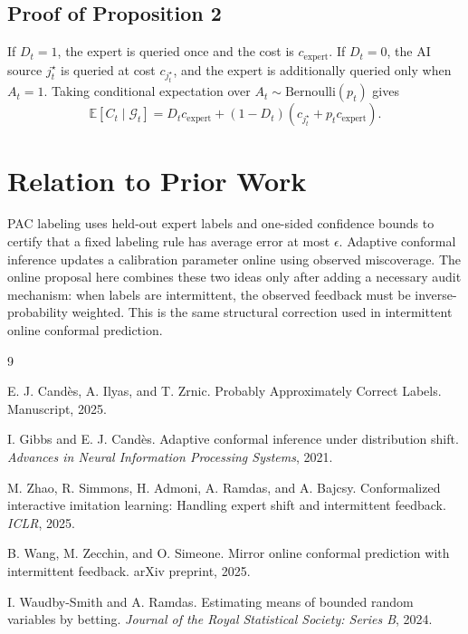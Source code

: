 \documentclass[11pt]{article}
\newcommand{\E}{\mathbb{E}}
\newcommand{\1}{\mathbf{1}}
\newcommand{\calG}{\mathcal{G}}
\begin{document}
\subsection{Proof of Proposition 2}

If $D_t=1$, the expert is queried once and the cost is $c_{\mathrm{expert}}$. If $D_t=0$, the AI source $j_t^\star$ is queried at cost $c_{j_t^\star}$, and the expert is additionally queried only when $A_t=1$. Taking conditional expectation over $A_t\sim\mathrm{Bernoulli}(p_t)$ gives
\[
\E[C_t\mid\calG_t]
=D_t c_{\mathrm{expert}}+(1-D_t)(c_{j_t^\star}+p_t c_{\mathrm{expert}}).
\]

\section{Relation to Prior Work}

PAC labeling uses held-out expert labels and one-sided confidence bounds to certify that a fixed labeling rule has average error at most $\epsilon$. Adaptive conformal inference updates a calibration parameter online using observed miscoverage. The online proposal here combines these two ideas only after adding a necessary audit mechanism: when labels are intermittent, the observed feedback must be inverse-probability weighted. This is the same structural correction used in intermittent online conformal prediction.

\begin{thebibliography}{9}

E. J. Cand\`es, A. Ilyas, and T. Zrnic.
\newblock Probably Approximately Correct Labels.
\newblock Manuscript, 2025.

I. Gibbs and E. J. Cand\`es.
\newblock Adaptive conformal inference under distribution shift.
\newblock \emph{Advances in Neural Information Processing Systems}, 2021.

M. Zhao, R. Simmons, H. Admoni, A. Ramdas, and A. Bajcsy.
\newblock Conformalized interactive imitation learning: Handling expert shift and intermittent feedback.
\newblock \emph{ICLR}, 2025.

B. Wang, M. Zecchin, and O. Simeone.
\newblock Mirror online conformal prediction with intermittent feedback.
\newblock arXiv preprint, 2025.

I. Waudby-Smith and A. Ramdas.
\newblock Estimating means of bounded random variables by betting.
\newblock \emph{Journal of the Royal Statistical Society: Series B}, 2024.

\end{thebibliography}
\end{document}
